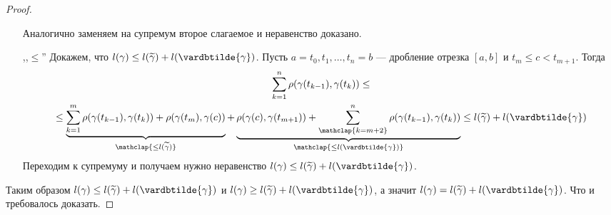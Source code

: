 \begin{proof}
\begin{enumerate}
\begin{notice}
      Аналогично заменяем на супремум второе слагаемое и неравенство доказано.
    \end{notice}
    \item[,,$\leq$''] Докажем, что $l(\gamma) \leq l(\widetilde{\gamma}) + l(\vardbtilde{\gamma})$. Пусть $a = t_0, t_1, \dotsc, t_n = b$ --- дробление отрезка $[a, b]$ и $t_m \leq c < t_{m + 1}$. Тогда
    \begin{equation*}
      \begin{gathered}
        \sum\limits_{k = 1}^{n} \rho(\gamma(t_{k - 1}), \gamma(t_k))
        \leq \\ \leq
        \underbrace{\sum\limits_{k = 1}^{m} \rho(\gamma(t_{k - 1}), \gamma(t_k)) + \rho(\gamma(t_m), \gamma(c))}_{\mathclap{\leq l(\widetilde{\gamma})}} +
        \underbrace{\rho(\gamma(c), \gamma(t_{m + 1})) + \sum\limits_{\mathclap{k = m + 2}}^{n} \rho(\gamma(t_{k - 1}), \gamma(t_k))}_{\mathclap{\leq l(\vardbtilde{\gamma})}} \leq l(\widetilde{\gamma}) + l(\vardbtilde{\gamma})
      \end{gathered}
    \end{equation*}
    Переходим к супремуму и получаем нужно неравенство $l(\gamma) \leq l(\widetilde{\gamma}) + l(\vardbtilde{\gamma})$.
    \end{enumerate}
    Таким образом $l(\gamma) \leq l(\widetilde{\gamma}) + l(\vardbtilde{\gamma})$ и $l(\gamma) \geq l(\widetilde{\gamma}) + l(\vardbtilde{\gamma})$, а значит $l(\gamma) = l(\widetilde{\gamma}) + l(\vardbtilde{\gamma})$. Что и требовалось доказать.
\end{proof}

